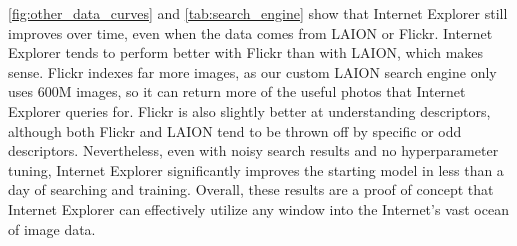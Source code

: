 \cref{fig:other_data_curves} and \cref{tab:search_engine} show that Internet Explorer still improves over time, even when the data comes from LAION or Flickr. 
Internet Explorer tends to perform better with Flickr than with LAION, which makes sense. Flickr indexes far more images, as our custom LAION search engine only uses 600M images, so it can return more of the useful photos that Internet Explorer queries for. Flickr is also slightly better at understanding descriptors, although both Flickr and LAION tend to be thrown off by specific or odd descriptors. Nevertheless, even with noisy search results and no hyperparameter tuning, Internet Explorer significantly improves the starting model in less than a day of searching and training. Overall, these results are a proof of concept that Internet Explorer can effectively utilize any window into the Internet's vast ocean of image data. 


